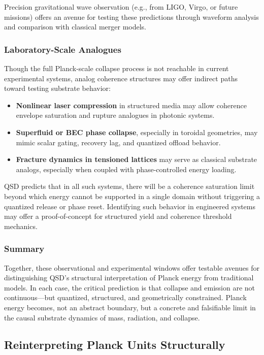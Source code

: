 \documentclass[entropy,article,submit,pdftex,moreauthors]{Definitions/mdpi}
\begin{document}
Precision gravitational wave observation (e.g., from LIGO, Virgo, or future missions) offers an avenue for testing these predictions through waveform analysis and comparison with classical merger models.

\subsubsection{Laboratory-Scale Analogues}

Though the full Planck-scale collapse process is not reachable in current experimental systems, analog coherence structures may offer indirect paths toward testing substrate behavior:
\begin{itemize}
  \item \textbf{Nonlinear laser compression} in structured media may allow coherence envelope saturation and rupture analogues in photonic systems.
  \item \textbf{Superfluid or BEC phase collapse}, especially in toroidal geometries, may mimic scalar gating, recovery lag, and quantized offload behavior.
  \item \textbf{Fracture dynamics in tensioned lattices} may serve as classical substrate analogs, especially when coupled with phase-controlled energy loading.
\end{itemize}

QSD predicts that in all such systems, there will be a coherence saturation limit beyond which energy cannot be supported in a single domain without triggering a quantized release or phase reset. Identifying such behavior in engineered systems may offer a proof-of-concept for structured yield and coherence threshold mechanics.

\subsubsection{Summary}

Together, these observational and experimental windows offer testable avenues for distinguishing QSD's structural interpretation of Planck energy from traditional models. In each case, the critical prediction is that collapse and emission are not continuous—but quantized, structured, and geometrically constrained. Planck energy becomes, not an abstract boundary, but a concrete and falsifiable limit in the causal substrate dynamics of mass, radiation, and collapse.
\subsection{Reinterpreting Planck Units Structurally}
\end{document}
